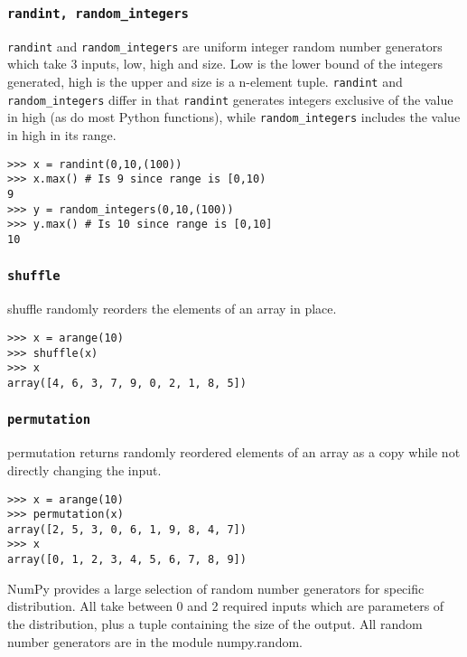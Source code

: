 \documentclass[KSmain.tex]{subfiles}
\begin{document}
\subsubsection{\texttt{randint, random\_integers}}
\texttt{randint} and \texttt{random\_integers} are uniform integer random number generators which take 3 inputs, low,
high and size. Low is the lower bound of the integers generated, high is the upper and size is a n-element
tuple. \texttt{randint} and \texttt{random\_integers} differ in that \texttt{randint} generates integers exclusive of the value in high
(as do most Python functions), while \texttt{random\_integers} includes the value in high in its range.
\begin{framed}
\begin{verbatim}
>>> x = randint(0,10,(100))
>>> x.max() # Is 9 since range is [0,10)
9
>>> y = random_integers(0,10,(100))
>>> y.max() # Is 10 since range is [0,10]
10
\end{verbatim}
\end{framed}
\subsubsection{\texttt{shuffle}}
shuffle randomly reorders the elements of an array in place.
\begin{framed}
\begin{verbatim}
>>> x = arange(10)
>>> shuffle(x)
>>> x
array([4, 6, 3, 7, 9, 0, 2, 1, 8, 5])
\end{verbatim}
\end{framed}
\subsubsection{\texttt{permutation}}
permutation returns randomly reordered elements of an array as a copy while not directly changing the
input.
\begin{framed}
\begin{verbatim}
>>> x = arange(10)
>>> permutation(x)
array([2, 5, 3, 0, 6, 1, 9, 8, 4, 7])
>>> x
array([0, 1, 2, 3, 4, 5, 6, 7, 8, 9])
\end{verbatim}
\end{framed}
NumPy provides a large selection of random number generators for specific distribution. All take between
0 and 2 required inputs which are parameters of the distribution, plus a tuple containing the size of the
output. All random number generators are in the module numpy.random.
%
\end{document}
